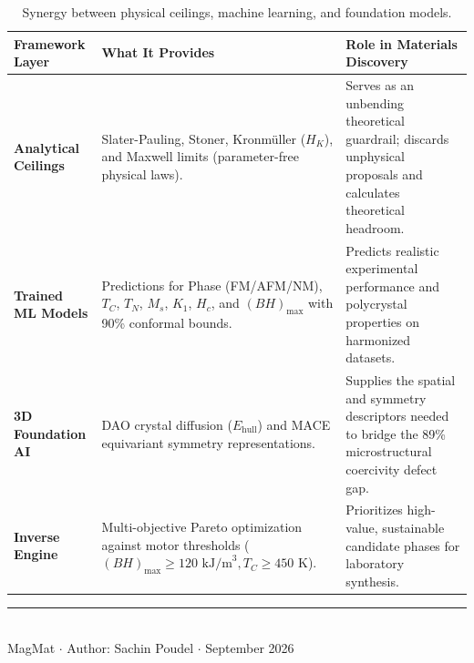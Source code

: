 \documentclass[10.5pt,a4paper]{article}
\begin{document}
\begin{table}[htbp]
\centering
\small
\renewcommand{\arraystretch}{1.2}
\begin{tabularx}{\textwidth}{lp{4.2cm}X}
\toprule
\textbf{Framework Layer} & \textbf{What It Provides} & \textbf{Role in Materials Discovery} \\
\midrule
\textbf{Analytical Ceilings} & Slater-Pauling, Stoner, Kronmüller ($H_K$), and Maxwell limits (parameter-free physical laws). & Serves as an unbending theoretical guardrail; discards unphysical proposals and calculates theoretical headroom. \\
\textbf{Trained ML Models} & Predictions for Phase (FM/AFM/NM), $T_C$, $T_N$, $M_s$, $K_1$, $H_c$, and $(BH)_{\max}$ with 90\% conformal bounds. & Predicts realistic experimental performance and polycrystal properties on harmonized datasets. \\
\textbf{3D Foundation AI} & DAO crystal diffusion ($E_{\text{hull}}$) and MACE equivariant symmetry representations. & Supplies the spatial and symmetry descriptors needed to bridge the 89\% microstructural coercivity defect gap. \\
\textbf{Inverse Engine} & Multi-objective Pareto optimization against motor thresholds ($(BH)_{\max} \ge 120\text{ kJ/m}^3, T_C \ge 450\text{ K}$). & Prioritizes high-value, sustainable candidate phases for laboratory synthesis. \\
\bottomrule
\end{tabularx}
\caption{Synergy between physical ceilings, machine learning, and foundation models.}
\label{tab:summary}
\end{table}

\begin{center}
\vspace{0.8em}
\rule{0.5\textwidth}{0.4pt}\\[0.5em]
{\small\sffamily\color{gray} MagMat $\cdot$ Author: Sachin Poudel $\cdot$ September 2026}
\end{center}
\end{document}

